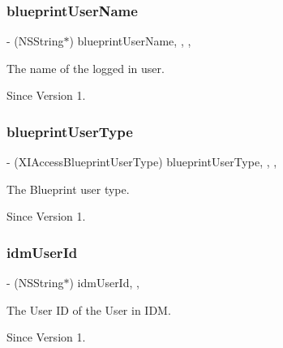 \subsubsection{\texorpdfstring{blueprint\+User\+Name}{blueprintUserName}}
{\footnotesize\ttfamily -\/ (N\+S\+String$\ast$) blueprint\+User\+Name\hspace{0.3cm}{\ttfamily [read]}, {\ttfamily [write]}, {\ttfamily [nonatomic]}, {\ttfamily [copy]}}



The name of the logged in user. 

\begin{DoxySince}{Since}
Version 1. 
\end{DoxySince}
\hypertarget{class_x_i_access_a9d0a61df17a8b9420ae7ed102e94ff8a}{}\label{class_x_i_access_a9d0a61df17a8b9420ae7ed102e94ff8a} 
\subsubsection{\texorpdfstring{blueprint\+User\+Type}{blueprintUserType}}
{\footnotesize\ttfamily -\/ (X\+I\+Access\+Blueprint\+User\+Type) blueprint\+User\+Type\hspace{0.3cm}{\ttfamily [read]}, {\ttfamily [write]}, {\ttfamily [nonatomic]}, {\ttfamily [assign]}}



The Blueprint user type. 

\begin{DoxySince}{Since}
Version 1. 
\end{DoxySince}
\hypertarget{class_x_i_access_a2ac8d7b7c68d94c6388f6a221a9e56d8}{}\label{class_x_i_access_a2ac8d7b7c68d94c6388f6a221a9e56d8} 
\subsubsection{\texorpdfstring{idm\+User\+Id}{idmUserId}}
{\footnotesize\ttfamily -\/ (N\+S\+String$\ast$) idm\+User\+Id\hspace{0.3cm}{\ttfamily [read]}, {\ttfamily [nonatomic]}, {\ttfamily [assign]}}



The User ID of the User in I\+DM. 

\begin{DoxySince}{Since}
Version 1. 
\end{DoxySince}
\hypertarget{class_x_i_access_ab1f2a1242110ed0016d94554f912dcaf}{}\label{class_x_i_access_ab1f2a1242110ed0016d94554f912dcaf} 

